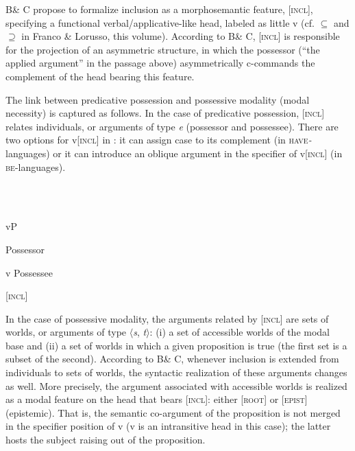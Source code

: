 \documentclass[output=paper,modfonts,nonflat]{langsci/langscibook}
\begin{document}
B\& C propose to formalize inclusion as a morphosemantic feature, [\textsc{incl}], specifying a functional verbal/applicative-like head, labeled as little v (cf. ${\subseteq}$ and ${\supseteq}$ in Franco \& Lorusso, this volume). According to B\& C, [\textsc{incl}] is responsible for the projection of an asymmetric structure, in which the possessor (“the applied argument” in the passage above) asymmetrically c-commands the complement of the head bearing this feature.  

The link between predicative possession and possessive modality (modal necessity) is captured as follows. In the case of predicative possession, [\textsc{incl]} relates individuals, or arguments of type \textit{e} (possessor and possessee). There are two options for v[\textsc{incl}] in : it can assign case to its complement (in \textsc{have}\textit{{}-}languages) or it can introduce an oblique argument in the specifier of v[\textsc{incl}] (in \textsc{be}{}-languages). 

\ea%
    \label{ex:key:3}
    \gll\\
        \\
    \glt
    \z

            vP    


  Possessor    

      v   Possessee 

    [\textsc{incl}]

In the case of possessive modality, the arguments related by [\textsc{incl]} are sets of worlds, or arguments of type ${\langle}$\textit{s}, \textit{t}${\rangle}$: (i) a set of accessible worlds of the modal base and (ii) a set of worlds in which a given proposition is true (the first set is a subset of the second). According to B\& C, whenever inclusion is extended from individuals to sets of worlds, the syntactic realization of these arguments changes as well. More precisely, the argument associated with accessible worlds is realized as a modal feature on the head that bears [\textsc{incl}]: either [\textsc{root}] or [\textsc{epist}] (epistemic). That is, the semantic co-argument of the proposition is not merged in the specifier position of v (v is an intransitive head in this case); the latter hosts the subject raising out of the proposition.

\ea%
    \label{ex:key:4}
    \gll\\
        \\
    \glt
    \z
\end{document}

